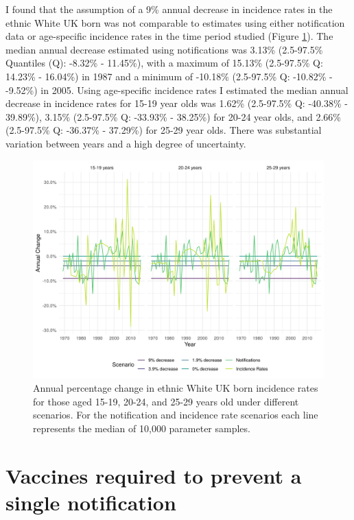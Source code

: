 \documentclass[11pt,twoside]{bristolthesis}
\begin{document}
  I found that the assumption of a 9\% annual decrease in incidence rates in the ethnic White UK born was not comparable to estimates using either notification data or age-specific incidence rates in the time period studied (Figure \ref{fig:plot-annual-change}). The median annual decrease estimated using notifications was 3.13\% (2.5-97.5\% Quantiles (Q): -8.32\% - 11.45\%), with a maximum of 15.13\% (2.5-97.5\% Q: 14.23\% - 16.04\%) in 1987 and a minimum of -10.18\% (2.5-97.5\% Q: -10.82\% - -9.52\%) in 2005. Using age-specific incidence rates I estimated the median annual decrease in incidence rates for 15-19 year olds was 1.62\% (2.5-97.5\% Q: -40.38\% - 39.89\%), 3.15\% (2.5-97.5\% Q: -33.93\% - 38.25\%) for 20-24 year olds, and 2.66\% (2.5-97.5\% Q: -36.37\% - 37.29\%) for 25-29 year olds. There was substantial variation between years and a high degree of uncertainty.
  \begin{figure}
  
  {\centering \includegraphics[width=0.8\linewidth]{chapters/evidence-policy-change/plot-annual-change-1} 
  
  }
  
  \caption{Annual percentage change in ethnic White UK born incidence rates for those aged 15-19, 20-24, and 25-29 years old under different scenarios. For the notification and incidence rate scenarios each line represents the median of 10,000 parameter samples.}\label{fig:plot-annual-change}
  \end{figure}
  \hypertarget{vaccines-required-to-prevent-a-single-notification}{%
  \section{Vaccines required to prevent a single notification}\label{vaccines-required-to-prevent-a-single-notification}}
  
\end{document}
